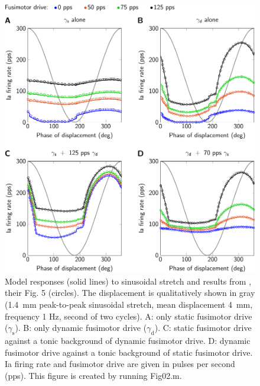 \documentclass[fleqn,10pt]{physiome}
\begin{document}
\begin{figure}
    \includegraphics[width=\textwidth]{Figure2.pdf}
    \caption{Model responses (solid lines) to sinusoidal stretch and results from \citet{maltenfort2003}, their Fig. 5 (circles). The displacement is qualitatively shown in gray (\SI{1.4}{\milli\meter} peak-to-peak sinusoidal stretch, mean displacement \SI{4}{\milli\meter}, frequency 1 Hz, second of two cycles). A: only static fusimotor drive ($\gamma_\mathrm{s}$). B: only dynamic fusimotor drive ($\gamma_\mathrm{d}$). C: static fusimotor drive against a tonic background of dynamic fusimotor drive. D: dynamic fusimotor drive against a tonic background of static fusimotor drive. Ia firing rate and fusimotor drive are given in pulses per second (pps). This figure is created by running Fig02.m.}
    \label{fig:fig5}
\end{figure}
\end{document}
